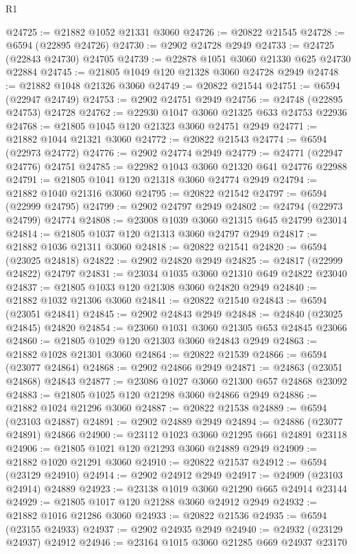 \begin{lexlean}{R1}
\begin{coremodule}
@24725 := @21882 @1052 @21331 @3060
@24726 := @20822 @21545
@24728 := @6594 (@22895 @24726)
@24730 := @2902 @24728 @2949
@24733 := @24725 (@22843 @24730) @24705
@24739 := @22878 @1051 @3060 @21330 @625 @24730 @22884
@24745 := @21805 @1049 @120 @21328 @3060 @24728 @2949
@24748 := @21882 @1048 @21326 @3060
@24749 := @20822 @21544
@24751 := @6594 (@22947 @24749)
@24753 := @2902 @24751 @2949
@24756 := @24748 (@22895 @24753) @24728
@24762 := @22930 @1047 @3060 @21325 @633 @24753 @22936
@24768 := @21805 @1045 @120 @21323 @3060 @24751 @2949
@24771 := @21882 @1044 @21321 @3060
@24772 := @20822 @21543
@24774 := @6594 (@22973 @24772)
@24776 := @2902 @24774 @2949
@24779 := @24771 (@22947 @24776) @24751
@24785 := @22982 @1043 @3060 @21320 @641 @24776 @22988
@24791 := @21805 @1041 @120 @21318 @3060 @24774 @2949
@24794 := @21882 @1040 @21316 @3060
@24795 := @20822 @21542
@24797 := @6594 (@22999 @24795)
@24799 := @2902 @24797 @2949
@24802 := @24794 (@22973 @24799) @24774
@24808 := @23008 @1039 @3060 @21315 @645 @24799 @23014
@24814 := @21805 @1037 @120 @21313 @3060 @24797 @2949
@24817 := @21882 @1036 @21311 @3060
@24818 := @20822 @21541
@24820 := @6594 (@23025 @24818)
@24822 := @2902 @24820 @2949
@24825 := @24817 (@22999 @24822) @24797
@24831 := @23034 @1035 @3060 @21310 @649 @24822 @23040
@24837 := @21805 @1033 @120 @21308 @3060 @24820 @2949
@24840 := @21882 @1032 @21306 @3060
@24841 := @20822 @21540
@24843 := @6594 (@23051 @24841)
@24845 := @2902 @24843 @2949
@24848 := @24840 (@23025 @24845) @24820
@24854 := @23060 @1031 @3060 @21305 @653 @24845 @23066
@24860 := @21805 @1029 @120 @21303 @3060 @24843 @2949
@24863 := @21882 @1028 @21301 @3060
@24864 := @20822 @21539
@24866 := @6594 (@23077 @24864)
@24868 := @2902 @24866 @2949
@24871 := @24863 (@23051 @24868) @24843
@24877 := @23086 @1027 @3060 @21300 @657 @24868 @23092
@24883 := @21805 @1025 @120 @21298 @3060 @24866 @2949
@24886 := @21882 @1024 @21296 @3060
@24887 := @20822 @21538
@24889 := @6594 (@23103 @24887)
@24891 := @2902 @24889 @2949
@24894 := @24886 (@23077 @24891) @24866
@24900 := @23112 @1023 @3060 @21295 @661 @24891 @23118
@24906 := @21805 @1021 @120 @21293 @3060 @24889 @2949
@24909 := @21882 @1020 @21291 @3060
@24910 := @20822 @21537
@24912 := @6594 (@23129 @24910)
@24914 := @2902 @24912 @2949
@24917 := @24909 (@23103 @24914) @24889
@24923 := @23138 @1019 @3060 @21290 @665 @24914 @23144
@24929 := @21805 @1017 @120 @21288 @3060 @24912 @2949
@24932 := @21882 @1016 @21286 @3060
@24933 := @20822 @21536
@24935 := @6594 (@23155 @24933)
@24937 := @2902 @24935 @2949
@24940 := @24932 (@23129 @24937) @24912
@24946 := @23164 @1015 @3060 @21285 @669 @24937 @23170

\end{coremodule}
\end{lexlean}
